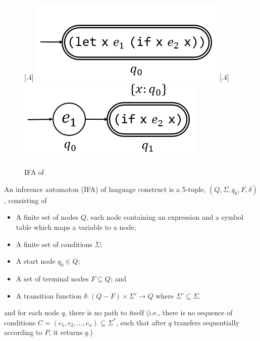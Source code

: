 \begin{figure}[t]
    \centering
    [.4\linewidth]{
        \includegraphics[scale=0.25]{images/ifa/ifa-and-1.png}
    }
    [.4\linewidth]{
        \includegraphics[scale=0.25]{images/ifa/ifa-and-2.png}
    }
    \caption{IFA of }
    \label{fig:ifa-and}
\end{figure}


\begin{Def}

    An inference automaton (IFA) of language construct  is a 5-tuple, $(Q, \Sigma, q_0, F, \delta)$, consisting of

    \begin{itemize}
        \item A finite set of nodes $Q$, each node containing an expression and a symbol table which maps a variable to a node;
        \item A finite set of conditions $\Sigma$;
        \item A start node $q_0 \in Q$;
        \item A set of terminal nodes $F \subseteq Q$; and
        \item A transition function $\delta: (Q-F) \times \Sigma' \to Q$ where $\Sigma' \subseteq \Sigma$.
    \end{itemize}
    and for each node $q$, there is no path to itself (i.e., there is no sequence of conditions $C = (c_1,c_2,\ldots,c_n)\subseteq \Sigma^*$, such that after $q$ transfers sequentially according to $P$, it returns $q$.)

\end{Def}


